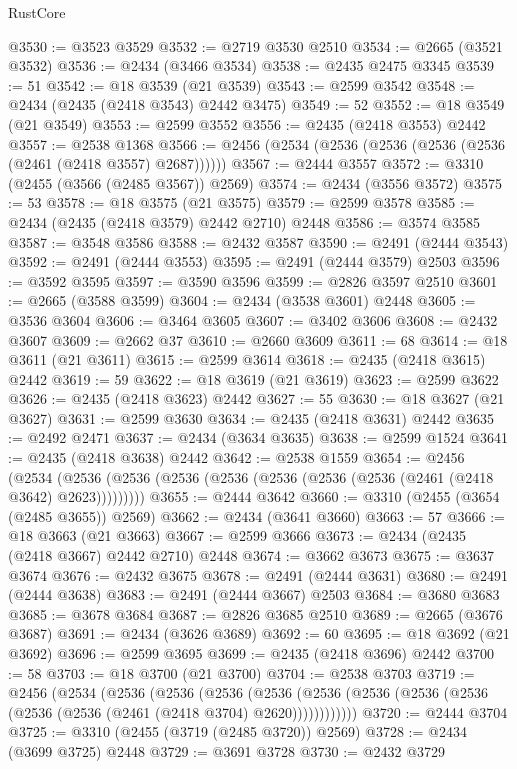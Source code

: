 \begin{lexlean}{RustCore}
\begin{coremodule}
@3530 := @3523 @3529
@3532 := @2719 @3530 @2510
@3534 := @2665 (@3521 @3532)
@3536 := @2434 (@3466 @3534)
@3538 := @2435 @2475 @3345
@3539 := 51
@3542 := @18 @3539 (@21 @3539)
@3543 := @2599 @3542
@3548 := @2434 (@2435 (@2418 @3543) @2442 @3475)
@3549 := 52
@3552 := @18 @3549 (@21 @3549)
@3553 := @2599 @3552
@3556 := @2435 (@2418 @3553) @2442
@3557 := @2538 @1368
@3566 := @2456 (@2534 (@2536 (@2536 (@2536 (@2536 (@2461 (@2418 @3557) @2687))))))
@3567 := @2444 @3557
@3572 := @3310 (@2455 (@3566 (@2485 @3567)) @2569)
@3574 := @2434 (@3556 @3572)
@3575 := 53
@3578 := @18 @3575 (@21 @3575)
@3579 := @2599 @3578
@3585 := @2434 (@2435 (@2418 @3579) @2442 @2710) @2448
@3586 := @3574 @3585
@3587 := @3548 @3586
@3588 := @2432 @3587
@3590 := @2491 (@2444 @3543)
@3592 := @2491 (@2444 @3553)
@3595 := @2491 (@2444 @3579) @2503
@3596 := @3592 @3595
@3597 := @3590 @3596
@3599 := @2826 @3597 @2510
@3601 := @2665 (@3588 @3599)
@3604 := @2434 (@3538 @3601) @2448
@3605 := @3536 @3604
@3606 := @3464 @3605
@3607 := @3402 @3606
@3608 := @2432 @3607
@3609 := @2662 @37
@3610 := @2660 @3609
@3611 := 68
@3614 := @18 @3611 (@21 @3611)
@3615 := @2599 @3614
@3618 := @2435 (@2418 @3615) @2442
@3619 := 59
@3622 := @18 @3619 (@21 @3619)
@3623 := @2599 @3622
@3626 := @2435 (@2418 @3623) @2442
@3627 := 55
@3630 := @18 @3627 (@21 @3627)
@3631 := @2599 @3630
@3634 := @2435 (@2418 @3631) @2442
@3635 := @2492 @2471
@3637 := @2434 (@3634 @3635)
@3638 := @2599 @1524
@3641 := @2435 (@2418 @3638) @2442
@3642 := @2538 @1559
@3654 := @2456
    (@2534 (@2536 (@2536 (@2536 (@2536 (@2536 (@2536 (@2536 (@2461 (@2418 @3642) @2623)))))))))
@3655 := @2444 @3642
@3660 := @3310 (@2455 (@3654 (@2485 @3655)) @2569)
@3662 := @2434 (@3641 @3660)
@3663 := 57
@3666 := @18 @3663 (@21 @3663)
@3667 := @2599 @3666
@3673 := @2434 (@2435 (@2418 @3667) @2442 @2710) @2448
@3674 := @3662 @3673
@3675 := @3637 @3674
@3676 := @2432 @3675
@3678 := @2491 (@2444 @3631)
@3680 := @2491 (@2444 @3638)
@3683 := @2491 (@2444 @3667) @2503
@3684 := @3680 @3683
@3685 := @3678 @3684
@3687 := @2826 @3685 @2510
@3689 := @2665 (@3676 @3687)
@3691 := @2434 (@3626 @3689)
@3692 := 60
@3695 := @18 @3692 (@21 @3692)
@3696 := @2599 @3695
@3699 := @2435 (@2418 @3696) @2442
@3700 := 58
@3703 := @18 @3700 (@21 @3700)
@3704 := @2538 @3703
@3719 := @2456
    (@2534
      (@2536
        (@2536
          (@2536
            (@2536 (@2536 (@2536 (@2536 (@2536 (@2536 (@2536 (@2461 (@2418 @3704) @2620))))))))))))
@3720 := @2444 @3704
@3725 := @3310 (@2455 (@3719 (@2485 @3720)) @2569)
@3728 := @2434 (@3699 @3725) @2448
@3729 := @3691 @3728
@3730 := @2432 @3729

\end{coremodule}
\end{lexlean}
